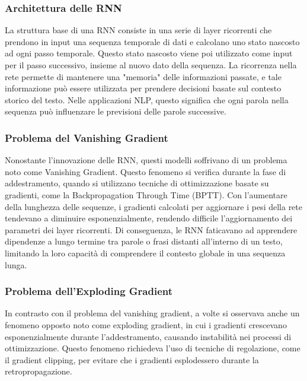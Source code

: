 \subsubsection{Architettura delle RNN}
La struttura base di una RNN consiste in una serie di layer ricorrenti che prendono in input una sequenza temporale di dati e calcolano uno stato nascosto ad ogni passo temporale. Questo stato nascosto viene poi utilizzato come input per il passo successivo, insieme al nuovo dato della sequenza. La ricorrenza nella rete permette di mantenere una "memoria" delle informazioni passate, e tale informazione può essere utilizzata per prendere decisioni basate sul contesto storico del testo. Nelle applicazioni NLP, questo significa che ogni parola nella sequenza può influenzare le previsioni delle parole successive.

\subsubsection{Problema del Vanishing Gradient}
Nonostante l'innovazione delle RNN, questi modelli soffrivano di un problema noto come Vanishing Gradient. Questo fenomeno si verifica durante la fase di addestramento, quando si utilizzano tecniche di ottimizzazione basate su gradienti, come la Backpropagation Through Time (BPTT). Con l'aumentare della lunghezza delle sequenze, i gradienti calcolati per aggiornare i pesi della rete tendevano a diminuire esponenzialmente, rendendo difficile l'aggiornamento dei parametri dei layer ricorrenti. Di conseguenza, le RNN faticavano ad apprendere dipendenze a lungo termine tra parole o frasi distanti all'interno di un testo, limitando la loro capacità di comprendere il contesto globale in una sequenza lunga.

\subsubsection{Problema dell'Exploding Gradient}
In contrasto con il problema del vanishing gradient, a volte si osservava anche un fenomeno opposto noto come exploding gradient, in cui i gradienti crescevano esponenzialmente durante l'addestramento, causando instabilità nei processi di ottimizzazione. Questo fenomeno richiedeva l'uso di tecniche di regolazione, come il gradient clipping, per evitare che i gradienti esplodessero durante la retropropagazione.

